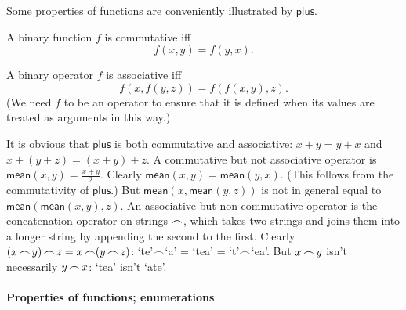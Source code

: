 Some properties of functions are conveniently illustrated by $\mathsf{plus}$.
\begin{definition}[Commutative]
	A binary function $f$ is commutative iff $$f(x,y) = f(y,x).$$  
\end{definition}
\begin{definition}[Associative]
	A binary operator $f$ is associative iff $$f(x,f(y,z)) = f(f(x,y),z).$$ (We need $f$ to be an operator to ensure that it is defined when its values are treated as arguments in this way.)
\end{definition}
It is obvious that $\mathsf{plus}$ is both commutative and associative: $x+y=y+x$ and $x+(y+z)=(x+y)+z$. A commutative but not associative operator is $\mathsf{mean}(x,y) = \tfrac{x+y}{2}$. Clearly $\mathsf{mean}(x,y)=\mathsf{mean}(y,x)$. (This follows from the commutativity of $\mathsf{plus}$.) But $\mathsf{mean}(x,\mathsf{mean}(y,z))$ is not in general equal to $\mathsf{mean}(\mathsf{mean}(x,y),z)$. An associative but non-commutative operator is the concatenation operator on strings $\mathop{\frown}$, which takes two strings and joins them into a longer string by appending the second to the first. Clearly $(x\mathop{\frown} y)\mathop{\frown} z = x \mathop{\frown} (y\mathop{\frown} z)$: `te'$\mathop{\frown}$`a' = `tea' = `t'$\mathop{\frown}$`ea'. But $x\mathop{\frown} y$ isn't necessarily $y\mathop{\frown} x$: `tea' isn't `ate'.



\paragraph{Properties of functions; enumerations}

